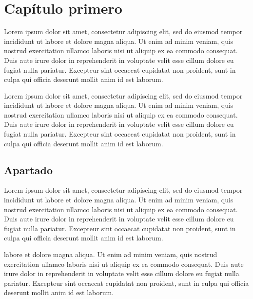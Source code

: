 \documentclass[12pt,a4paper]{report}
\newcommand{\headlinecolor}{\color{slcolor}}
\begin{document}
\chapter{Capítulo primero}\label{cap:cap1}

Lorem ipsum dolor sit amet, consectetur adipiscing elit, sed do eiusmod tempor incididunt ut labore et dolore magna aliqua. Ut enim ad minim veniam, quis nostrud exercitation ullamco laboris nisi ut aliquip ex ea commodo consequat. Duis aute irure dolor in reprehenderit in voluptate velit esse cillum dolore eu fugiat nulla pariatur. Excepteur sint occaecat cupidatat non proident, sunt in culpa qui officia deserunt mollit anim id est laborum.

Lorem ipsum dolor sit amet, consectetur adipiscing elit, sed do eiusmod tempor incididunt ut labore et dolore magna aliqua. Ut enim ad minim veniam, quis nostrud exercitation ullamco laboris nisi ut aliquip ex ea commodo consequat. Duis aute irure dolor in reprehenderit in voluptate velit esse cillum dolore eu fugiat nulla pariatur. Excepteur sint occaecat cupidatat non proident, sunt in culpa qui officia deserunt mollit anim id est laborum.


\section{Apartado}\label{sec:apartado}


Lorem ipsum dolor sit amet, consectetur adipiscing elit, sed do eiusmod tempor incididunt ut labore et dolore magna aliqua. Ut enim ad minim veniam, quis nostrud exercitation ullamco laboris nisi ut aliquip ex ea commodo consequat. Duis aute irure dolor in reprehenderit in voluptate velit esse cillum dolore eu fugiat nulla pariatur. Excepteur sint occaecat cupidatat non proident, sunt in culpa qui officia deserunt mollit anim id est laborum.

\begin{center}
{\textbf{\headlinecolor{Destacado duis aute irure dolor\\
in reprehenderit in voluptate velit esse\\
cillum dolore eu fugiat}}}
\end{center}

labore et dolore magna aliqua. Ut enim ad minim veniam, quis nostrud exercitation ullamco laboris nisi ut aliquip ex ea commodo consequat. Duis aute irure dolor in reprehenderit in voluptate velit esse cillum dolore eu fugiat nulla pariatur. Excepteur sint occaecat cupidatat non proident, sunt in culpa qui officia deserunt mollit anim id est laborum.
\end{document}

